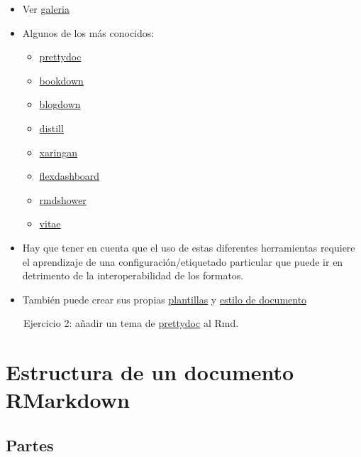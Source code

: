 \documentclass[
]{article}
\providecommand{\tightlist}{%
  \setlength{\itemsep}{0pt}\setlength{\parskip}{0pt}}
\begin{document}
\begin{itemize}
\item
  Ver \href{https://rmarkdown.rstudio.com/gallery.html}{galeria}
\item
  Algunos de los más conocidos:

  \begin{itemize}
  \tightlist
  \item
    \href{https://github.com/yixuan/prettydoc/}{prettydoc}
  \item
    \href{https://bookdown.org/yihui/bookdown/}{bookdown}
  \item
    \href{https://bookdown.org/yihui/blogdown/}{blogdown}
  \item
    \href{https://github.com/rstudio/distill}{distill}
  \item
    \href{https://bookdown.org/yihui/rmarkdown/xaringan-format.html}{xaringan}
  \item
    \href{https://rmarkdown.rstudio.com/flexdashboard/}{flexdashboard}
  \item
    \href{http://mangothecat.github.io/rmdshower/skeleton.html}{rmdshower}
  \item
    \href{https://github.com/mitchelloharawild/vitae}{vitae}
  \end{itemize}
\item
  Hay que tener en cuenta que el uso de estas diferentes herramientas
  requiere el aprendizaje de una configuración/etiquetado particular que
  puede ir en detrimento de la interoperabilidad de los formatos.
\item
  También puede crear sus propias
  \href{https://rstudio.github.io/rstudio-extensions/rmarkdown_templates.html}{plantillas}
  y
  \href{https://bookdown.org/yihui/rmarkdown/word-document.html}{estilo
  de documento}
\end{itemize}

👩‍💻 👨‍💻 Ejercicio 2: añadir un tema de
\href{https://github.com/yixuan/prettydoc/}{prettydoc} al Rmd.

\hypertarget{estructura-de-un-documento-rmarkdown}{%
\section{Estructura de un documento
RMarkdown}\label{estructura-de-un-documento-rmarkdown}}

\hypertarget{partes}{%
\subsection{Partes}\label{partes}}
\end{document}
